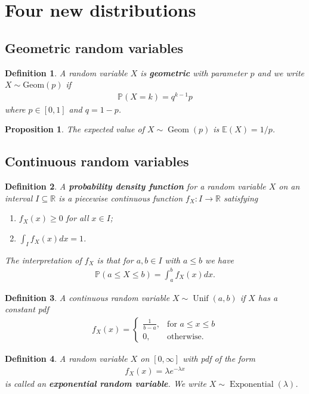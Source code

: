 \documentclass{article}
\theoremstyle{sltheorem}
\newtheorem{definition}{Definition}[section]
\newtheorem{proposition}[theorem]{Proposition}
\newcommand{\R}{\mathbb{R}}
\renewcommand{\P}{\mathbb{P}}
\newcommand{\E}{\mathbb{E}}
\DeclareMathOperator{\Geom}{Geom}
\DeclareMathOperator{\Unif}{Unif}
\DeclareMathOperator{\Exp}{Exponential}
\newcommand*\B[1]{\textbf{#1}}
\begin{document}
\section{Four new distributions}
\subsection{Geometric random variables}
\begin{definition}
    A random variable $X$ is \B{geometric} with parameter $p$ and we write $X\sim \text{Geom}(p)$ if
    \begin{align*}
        \P(X=k)=q^{k-1}p
    \end{align*}
    where $p\in[0,1]$ and $q=1-p$.
\end{definition}
\begin{proposition}
    The expected value of $X\sim\Geom(p)$ is $\E(X)=1/p$.
\end{proposition}
\subsection{Continuous random variables}
\begin{definition}
    A \B{probability density function} for a random variable $X$ on an
    interval $I\subseteq\R$ is a piecewise continuous function $f_X:I\to\R$ satisfying
    \begin{enumerate}
        \item $f_X(x) \geq 0$ for all $x\in I$;
        \item $\int_I f_X(x) dx =1$.
    \end{enumerate}
    The interpretation of $f_X$ is that for $a,b\in I$ with $a\leq b$ we have
    \begin{align*}
        \P(a\leq X\leq b)=\int_a^b f_X(x)dx.
    \end{align*}
\end{definition}
\begin{definition}
    A continuous random variable $X\sim\Unif(a,b)$ if $X$ has a constant pdf
    \begin{align*}
        f_X(x) = \begin{cases}
            \frac{1}{b-a}, &\text{for }a\leq x\leq b\\
            0, &\text{otherwise.}
        \end{cases}
    \end{align*}
\end{definition}
\begin{definition}
    A random variable $X$ on $[0,\infty]$ with pdf of the form
    \begin{align*}
        f_X(x) = \lambda e^{-\lambda x}
    \end{align*}
    is called an \B{exponential random variable}.
    We write $X\sim\Exp(\lambda)$.
\end{definition}
\end{document}
